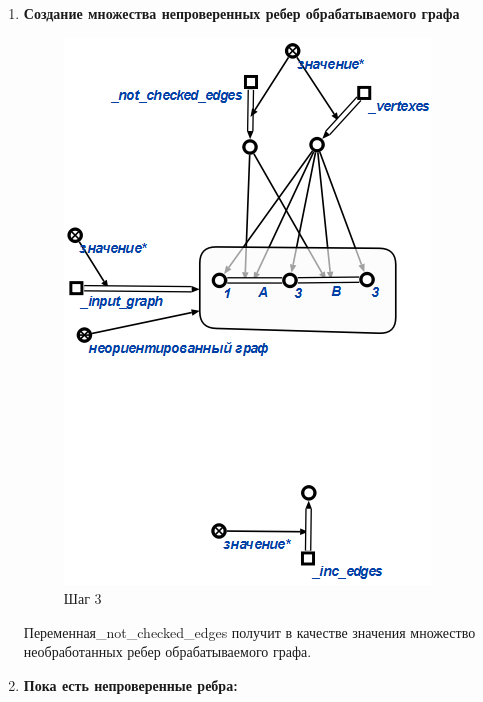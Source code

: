 \begin{enumerate}
\item
\textbf{Создание множества непроверенных ребер обрабатываемого графа}
\begin{figure}[H]
  \centering
  \includegraphics[scale=0.7]{algo/3.png}
  \caption{Шаг 3}
\end{figure}
Переменная\_not\_checked\_edges получит в качестве значения множество необработанных  ребер обрабатываемого графа. 

\item
\textbf{Пока есть непроверенные ребра:}


\end{enumerate}

